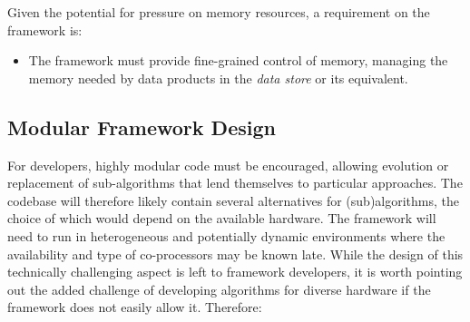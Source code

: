\documentclass[../main-v1.tex]{subfiles}
\begin{document}

Given the potential for pressure on memory resources, a requirement on the framework is:

\begin{itemize}
    \item The framework must provide fine-grained control of memory, managing the memory needed by data products in the {\it data store} or its equivalent.
\end{itemize}


\subsection{Modular Framework Design} \label{subsec:fworks:modular}

For developers, highly modular code must be encouraged, allowing evolution or replacement of sub-algorithms that lend themselves to particular approaches.
The codebase will therefore likely contain several alternatives for (sub)algorithms, the choice of which would depend on the available hardware.  The framework will need to run in heterogeneous and potentially dynamic environments where the availability and type of co-processors may be known late.  While the design of this technically challenging aspect is left to framework developers, it is worth pointing out the added challenge of developing algorithms for diverse hardware if the framework does not easily allow it.  Therefore:
\end{document}
